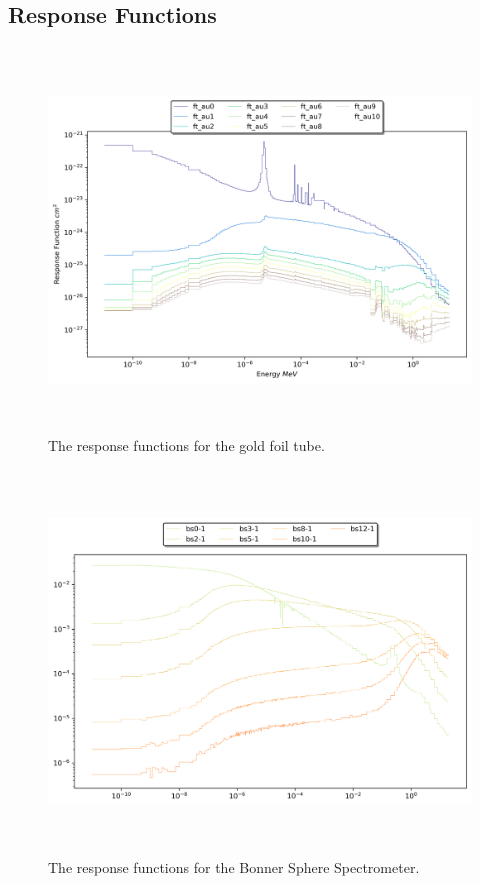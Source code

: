 \subsection{Response Functions}



\begin{figure}[htb]
\centering
\includegraphics[height=4in]{tex/figures/ft_au.png}
\caption[Gold Foil Tube Response Functions]{The response functions for the gold foil tube.}
\label{fig:ft_au_rfs}
\end{figure}


\begin{figure}[htb]
\centering
\includegraphics[height=4in]{tex/figures/bs.png}
\caption[Bonner Sphere Spectrometer Response Functions]{The response functions for the Bonner Sphere Spectrometer.}
\label{fig:bs_rfs}
\end{figure}


